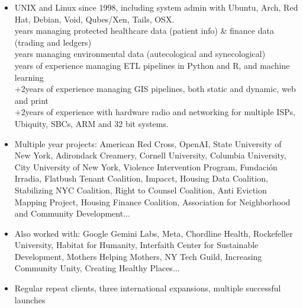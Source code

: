 \begin{itemize}
        \item UNIX and Linux since 1998, including system admin with Ubuntu, Arch, Red Hat, Debian, Void, Qubes/Xen, Tails, OSX.
        \\ \number\numexpr{}\relax\space years managing protected healthcare data (patient info) \& finance data (trading and ledgers)
        \\ \number\numexpr{}\relax\space years managing environmental data (autecological and synecological) 
        \\ \number\numexpr{}\relax\space years of experience managing ETL pipelines in Python and R, and machine learning
        \\ \number{}+2\relax\space years of experience managing GIS pipelines, both static and dynamic, web and print
        \\ \number{}+2\relax\space years of experience with hardware radio and networking for multiple ISPs, Ubiquity, SBCs, ARM and 32 bit systems.
    \end{itemize}

    \begin{itemize}
        \item Multiple year projects: {\color{red}American Red Cross, OpenAI}, State University of New York, Adirondack Creamery, Cornell University, Columbia University, City University of New York, Violence Intervention Program, Fundación Irradia, Flatbush Tenant Coalition, Impacct, Housing Data Coalition, Stabilizing NYC Coalition, Right to Counsel Coalition, Anti Eviction Mapping Project, Housing Finance Coalition, Association for Neighborhood and Community Development...
        
        \item Also worked with: {\color{red} Google Gemini Labs, Meta, Chordline Health, Rockefeller University, Habitat for Humanity}, Interfaith Center for Sustainable Development, Mothers Helping Mothers, NY Tech Guild, Increasing Community Unity, Creating Healthy Places...
    
        \item Regular repeat clients, three international expansions, multiple successful launches
    \end{itemize}

